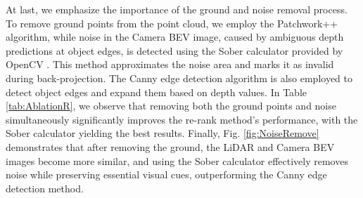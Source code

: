 At last, we emphasize the importance of the ground and noise removal process. To remove ground points from the point cloud, we employ the Patchwork++ \cite{lee2022patchworkpp} algorithm, while noise in the Camera BEV image, caused by ambiguous depth predictions at object edges, is detected using the Sober calculator provided by OpenCV \cite{bradski2008learning}. This method approximates the noise area and marks it as invalid during back-projection. The Canny edge detection algorithm is also employed to detect object edges and expand them based on depth values. In Table \ref{tab:AblationR}, we observe that removing both the ground points and noise simultaneously significantly improves the re-rank method’s performance, with the Sober calculator yielding the best results. Finally, Fig. \ref{fig:NoiseRemove} demonstrates that after removing the ground, the LiDAR and Camera BEV images become more similar, and using the Sober calculator effectively removes noise while preserving essential visual cues, outperforming the Canny edge detection method.
